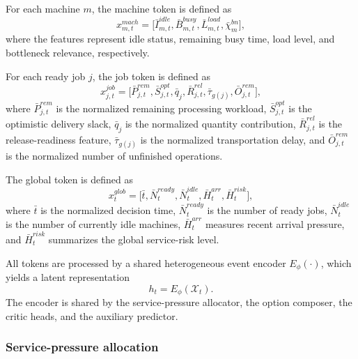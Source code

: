\documentclass[a4paper,fleqn]{cas-sc}
\begin{document}
For each machine $m$, the machine token is defined as
\begin{equation}
x_{m,t}^{mach}=
\big[
\bar I_{m,t}^{idle},
\bar B_{m,t}^{busy},
\bar L_{m,t}^{load},
\bar \chi_m^{bn}
\big],
\label{eq:mach_token}
\end{equation}
where the features represent idle status, remaining busy time, load level, and bottleneck relevance, respectively.

For each ready job $j$, the job token is defined as
\begin{equation}
x_{j,t}^{job}=
\big[
\bar P_{j,t}^{rem},
\bar S_{j,t}^{opt},
\bar q_j,
\bar R_{j,t}^{rel},
\bar \tau_{g(j)},
\bar O_{j,t}^{rem}
\big],
\label{eq:job_token}
\end{equation}
where $\bar P_{j,t}^{rem}$ is the normalized remaining processing workload, $\bar S_{j,t}^{opt}$ is the optimistic delivery slack, $\bar q_j$ is the normalized quantity contribution, $\bar R_{j,t}^{rel}$ is the release-readiness feature, $\bar \tau_{g(j)}$ is the normalized transportation delay, and $\bar O_{j,t}^{rem}$ is the normalized number of unfinished operations.

The global token is defined as
\begin{equation}
x_t^{glob}=
\big[
\bar t,
\bar N_t^{ready},
\bar N_t^{idle},
\bar H_t^{arr},
\bar H_t^{risk}
\big],
\label{eq:global_token}
\end{equation}
where $\bar t$ is the normalized decision time, $\bar N_t^{ready}$ is the number of ready jobs, $\bar N_t^{idle}$ is the number of currently idle machines, $\bar H_t^{arr}$ measures recent arrival pressure, and $\bar H_t^{risk}$ summarizes the global service-risk level.

All tokens are processed by a shared heterogeneous event encoder $E_{\phi}(\cdot)$, which yields a latent representation
\begin{equation}
h_t=E_{\phi}(\mathcal{X}_t).
\label{eq:shared_encoder}
\end{equation}
The encoder is shared by the service-pressure allocator, the option composer, the critic heads, and the auxiliary predictor.

\subsubsection{Service-pressure allocation}
\end{document}
